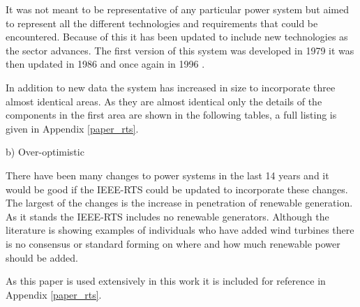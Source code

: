 \documentclass[a4paper,oneside,12pt]{report}
\begin{document}
It was not meant to be representative of any particular power system but aimed to represent all the different technologies and requirements that could be encountered. Because of this it has been updated to include new technologies as the sector advances. The first version of this system was developed in 1979 \cite{IEEERTSTaskForceofAPMSubcommittee1979} it was then updated in 1986 \cite{Allan1986} and once again in 1996 \cite{Grigg1999}.

In addition to new data the system has increased in size to incorporate three almost identical areas. As they are almost identical only the details of the components in the first area are shown in the following tables, a full listing is given in Appendix \ref{paper_rts}.

b) Over-optimistic




There have been many changes to power systems in the last 14 years and it would be good if the IEEE-RTS could be updated to incorporate these changes. The largest of the changes is the increase in penetration of renewable generation. As it stands the IEEE-RTS includes no renewable generators. Although the literature is showing examples of individuals who have added wind turbines there is no consensus or standard forming on where and how much renewable power should be added.

As this paper is used extensively in this work it is included for reference in Appendix \ref{paper_rts}.
\end{document}
